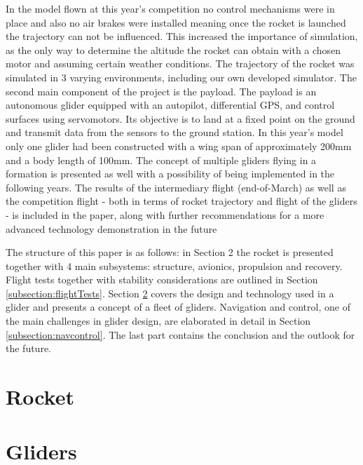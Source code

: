 \documentclass[]{iac}
\begin{document}
In the model flown at this year's competition no control mechanisms were in place and also no air brakes were installed meaning once the rocket is launched the trajectory can not be influenced. This increased the importance of simulation, as the only way to determine the altitude the rocket can obtain with a chosen motor and assuming certain weather conditions.  The trajectory of the rocket was simulated in 3 varying environments, including our own developed simulator. 
The second main component of the project is the payload. The payload is an autonomous glider equipped with an autopilot, differential GPS, and control surfaces using servomotors. Its objective is to land at a fixed point on the ground and transmit data from the sensors to the ground station. In this year's model only one glider had been constructed with a wing span of approximately 200mm and a body length of 100mm. The concept of multiple gliders flying in a formation is presented as well with a possibility of being implemented in the following years.  
The results of the intermediary flight (end-of-March) as well as the competition flight - both in terms of rocket trajectory and flight of the gliders - is included in the paper, along with further recommendations for a more advanced technology demonstration in the future

The structure of this paper is as follows: in Section 2 the rocket is presented together with 4 main subsystems: structure, avionics, propulsion and recovery. Flight tests together with stability considerations are outlined in Section \ref{subsection:flightTests}.  Section \ref{section:gliders}  covers the design and technology used in a glider and presents a concept of a fleet of gliders. Navigation and control, one of the main challenges in glider design, are elaborated in detail in Section \ref{subsection:navcontrol}. The last part contains the conclusion and the outlook for the future. 


\section{Rocket}




\section{Gliders}
\label{section:gliders}


\end{document}
